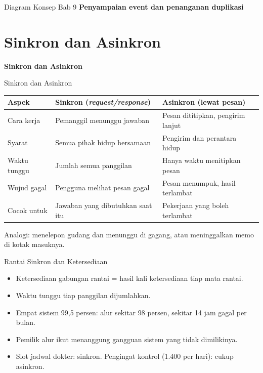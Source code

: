 \documentclass[aspectratio=169, table, 12pt]{beamer}
\begin{document}
\begin{frame}{{\Large Diagram Konsep Bab 9}}
  \centering
  {\small\bfseries Penyampaian event dan penanganan duplikasi}\par\medskip
\end{frame}

\section{Sinkron dan Asinkron}

\begin{frame}{\hfill}
  \centering
  \Huge{\textbf{Sinkron dan Asinkron}}
\end{frame}

\begin{frame}{{\Large Sinkron dan Asinkron}}
  \footnotesize
  \begin{tabularx}{\textwidth}{>{\raggedright\arraybackslash}p{2.8cm}
      >{\raggedright\arraybackslash}X >{\raggedright\arraybackslash}X}
    \hline
    \textbf{Aspek} & \textbf{Sinkron (\textit{request/response})}
      & \textbf{Asinkron (lewat pesan)} \\
    \hline
    Cara kerja & Pemanggil menunggu jawaban & Pesan dititipkan, pengirim lanjut \\
    \hline
    Syarat & Semua pihak hidup bersamaan & Pengirim dan perantara hidup \\
    \hline
    Waktu tunggu & Jumlah semua panggilan & Hanya waktu menitipkan pesan \\
    \hline
    Wujud gagal & Pengguna melihat pesan gagal & Pesan menumpuk, hasil terlambat \\
    \hline
    Cocok untuk & Jawaban yang dibutuhkan saat itu & Pekerjaan yang boleh terlambat \\
    \hline
  \end{tabularx}

  \vspace{10pt}
  \small
  Analogi: menelepon gudang dan menunggu di gagang, atau meninggalkan memo di
  kotak masuknya.
\end{frame}

\begin{frame}{{\Large Rantai Sinkron dan Ketersediaan}}
  \vspace{6pt}
  \begin{itemize}
    \item Ketersediaan gabungan rantai = hasil kali ketersediaan tiap mata
          rantai.
    \item Waktu tunggu tiap panggilan dijumlahkan.
    \item Empat sistem 99,5 persen: alur sekitar 98 persen, sekitar 14 jam
          gagal per bulan.
    \item Pemilik alur ikut menanggung gangguan sistem yang tidak dimilikinya.
    \item Slot jadwal dokter: sinkron. Pengingat kontrol (1.400 per hari):
          cukup asinkron.
  \end{itemize}
\end{frame}
\end{document}
